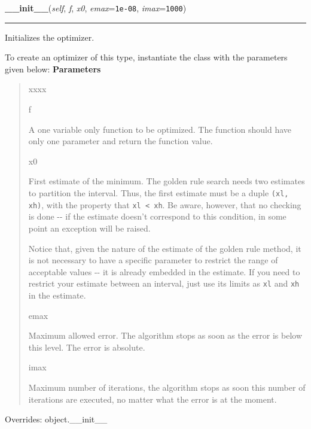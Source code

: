 \hspace{.8\funcindent}\begin{boxedminipage}{\funcwidth}

    \raggedright \textbf{\_\_init\_\_}(\textit{self}, \textit{f}, \textit{x0}, \textit{emax}={\tt 1e-08}, \textit{imax}={\tt 1000})

    \vspace{-1.5ex}

    \rule{\textwidth}{0.5\fboxrule}
\setlength{\parskip}{2ex}

Initializes the optimizer.

To create an optimizer of this type, instantiate the class with the
parameters given below:
\setlength{\parskip}{1ex}
      \textbf{Parameters}
      \vspace{-1ex}

      \begin{quote}
        \begin{Ventry}{xxxx}

          \item[f]


A one variable only function to be optimized. The function should
have only one parameter and return the function value.
          \item[x0]


First estimate of the minimum. The golden rule search needs two
estimates to partition the interval. Thus, the first estimate must
be a duple \texttt{(xl, xh)}, with the property that \texttt{xl < xh}. Be
aware, however, that no checking is done -{}- if the estimate doesn't
correspond to this condition, in some point an exception will be
raised.

Notice that, given the nature of the estimate of the golden rule
method, it is not necessary to have a specific parameter to restrict
the range of acceptable values -{}- it is already embedded in the
estimate. If you need to restrict your estimate between an interval,
just use its limits as \texttt{xl} and \texttt{xh} in the estimate.
          \item[emax]


Maximum allowed error. The algorithm stops as soon as the error is
below this level. The error is absolute.
          \item[imax]


Maximum number of iterations, the algorithm stops as soon this
number of iterations are executed, no matter what the error is at
the moment.
        \end{Ventry}

      \end{quote}

      Overrides: object.\_\_init\_\_

    \end{boxedminipage}

